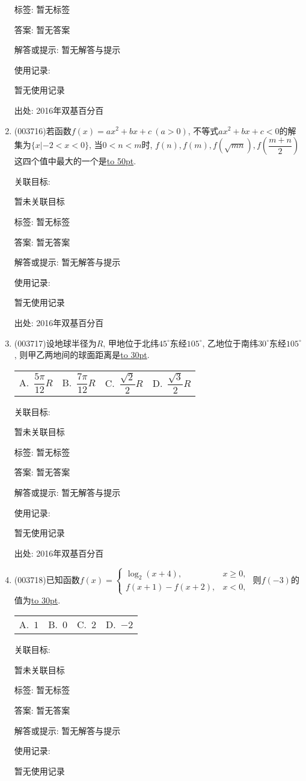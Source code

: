 \documentclass[10pt,a4paper]{article}
\newcommand{\blank}[1]{\underline{\hbox to #1pt{}}}
\newcommand{\fourch}[4]{\par\begin{tabular}{p{.23\textwidth}p{.23\textwidth}p{.23\textwidth}p{.23\textwidth}}
A.~#1 &B.~#2& C.~#3& D.~#4
\end{tabular}}
\begin{document}
\begin{enumerate}[1.]
标签: 暂无标签

答案: 暂无答案

解答或提示: 暂无解答与提示

使用记录:

暂无使用记录


出处: 2016年双基百分百
\item { (003716)}若函数$f(x)=ax^2+bx+c\ (a>0)$, 不等式$ax^2+bx+c<0$的解集为$\{x|-2<x<0\}$, 当$0<n<m$时, $f(n),f(m),f(\sqrt{mn}),f\left(\dfrac{m+n}2\right)$这四个值中最大的一个是\blank{50}.


关联目标:

暂未关联目标



标签: 暂无标签

答案: 暂无答案

解答或提示: 暂无解答与提示

使用记录:

暂无使用记录


出处: 2016年双基百分百
\item { (003717)}设地球半径为$R$, 甲地位于北纬$45^\circ$东经$105^\circ$, 乙地位于南纬$30^\circ$东经$105^\circ$, 则甲乙两地间的球面距离是\blank{30}.
\fourch{$\dfrac{5\pi}{12}R$}{$\dfrac{7\pi}{12}R$}{$\dfrac{\sqrt{2}}2R$}{$\dfrac{\sqrt{3}}2R$}


关联目标:

暂未关联目标



标签: 暂无标签

答案: 暂无答案

解答或提示: 暂无解答与提示

使用记录:

暂无使用记录


出处: 2016年双基百分百
\item { (003718)}已知函数$f(x)=\begin{cases}
\log_2(x+4), & x\ge 0,\\f(x+1)-f(x+2), & x<0,\end{cases}$ 则$f(-3)$的值为\blank{30}.
\fourch{$1$}{$0$}{$2$}{$-2$}


关联目标:

暂未关联目标



标签: 暂无标签

答案: 暂无答案

解答或提示: 暂无解答与提示

使用记录:

暂无使用记录



\end{enumerate}
\end{document}
